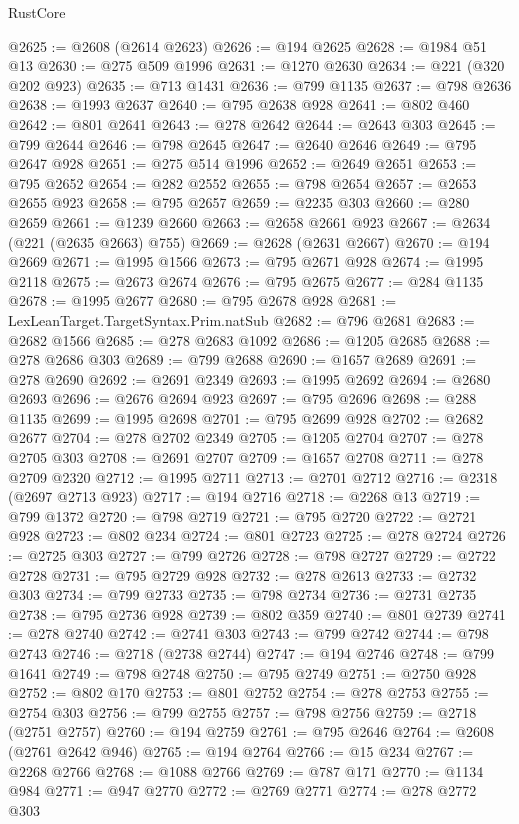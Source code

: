 \begin{lexlean}{RustCore}
\begin{coremodule}
@2625 := @2608 (@2614 @2623)
@2626 := @194 @2625
@2628 := @1984 @51 @13
@2630 := @275 @509 @1996
@2631 := @1270 @2630
@2634 := @221 (@320 @202 @923)
@2635 := @713 @1431
@2636 := @799 @1135
@2637 := @798 @2636
@2638 := @1993 @2637
@2640 := @795 @2638 @928
@2641 := @802 @460
@2642 := @801 @2641
@2643 := @278 @2642
@2644 := @2643 @303
@2645 := @799 @2644
@2646 := @798 @2645
@2647 := @2640 @2646
@2649 := @795 @2647 @928
@2651 := @275 @514 @1996
@2652 := @2649 @2651
@2653 := @795 @2652
@2654 := @282 @2552
@2655 := @798 @2654
@2657 := @2653 @2655 @923
@2658 := @795 @2657
@2659 := @2235 @303
@2660 := @280 @2659
@2661 := @1239 @2660
@2663 := @2658 @2661 @923
@2667 := @2634 (@221 (@2635 @2663) @755)
@2669 := @2628 (@2631 @2667)
@2670 := @194 @2669
@2671 := @1995 @1566
@2673 := @795 @2671 @928
@2674 := @1995 @2118
@2675 := @2673 @2674
@2676 := @795 @2675
@2677 := @284 @1135
@2678 := @1995 @2677
@2680 := @795 @2678 @928
@2681 := LexLeanTarget.TargetSyntax.Prim.natSub
@2682 := @796 @2681
@2683 := @2682 @1566
@2685 := @278 @2683 @1092
@2686 := @1205 @2685
@2688 := @278 @2686 @303
@2689 := @799 @2688
@2690 := @1657 @2689
@2691 := @278 @2690
@2692 := @2691 @2349
@2693 := @1995 @2692
@2694 := @2680 @2693
@2696 := @2676 @2694 @923
@2697 := @795 @2696
@2698 := @288 @1135
@2699 := @1995 @2698
@2701 := @795 @2699 @928
@2702 := @2682 @2677
@2704 := @278 @2702 @2349
@2705 := @1205 @2704
@2707 := @278 @2705 @303
@2708 := @2691 @2707
@2709 := @1657 @2708
@2711 := @278 @2709 @2320
@2712 := @1995 @2711
@2713 := @2701 @2712
@2716 := @2318 (@2697 @2713 @923)
@2717 := @194 @2716
@2718 := @2268 @13
@2719 := @799 @1372
@2720 := @798 @2719
@2721 := @795 @2720
@2722 := @2721 @928
@2723 := @802 @234
@2724 := @801 @2723
@2725 := @278 @2724
@2726 := @2725 @303
@2727 := @799 @2726
@2728 := @798 @2727
@2729 := @2722 @2728
@2731 := @795 @2729 @928
@2732 := @278 @2613
@2733 := @2732 @303
@2734 := @799 @2733
@2735 := @798 @2734
@2736 := @2731 @2735
@2738 := @795 @2736 @928
@2739 := @802 @359
@2740 := @801 @2739
@2741 := @278 @2740
@2742 := @2741 @303
@2743 := @799 @2742
@2744 := @798 @2743
@2746 := @2718 (@2738 @2744)
@2747 := @194 @2746
@2748 := @799 @1641
@2749 := @798 @2748
@2750 := @795 @2749
@2751 := @2750 @928
@2752 := @802 @170
@2753 := @801 @2752
@2754 := @278 @2753
@2755 := @2754 @303
@2756 := @799 @2755
@2757 := @798 @2756
@2759 := @2718 (@2751 @2757)
@2760 := @194 @2759
@2761 := @795 @2646
@2764 := @2608 (@2761 @2642 @946)
@2765 := @194 @2764
@2766 := @15 @234
@2767 := @2268 @2766
@2768 := @1088 @2766
@2769 := @787 @171
@2770 := @1134 @984
@2771 := @947 @2770
@2772 := @2769 @2771
@2774 := @278 @2772 @303

\end{coremodule}
\end{lexlean}
